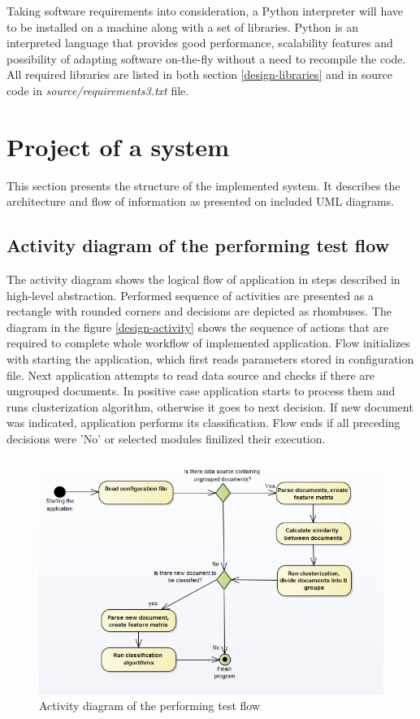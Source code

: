 Taking software requirements into consideration, a Python interpreter will have to be installed on a machine along with a set of libraries. Python is an interpreted language that provides good performance, scalability features and possibility of adapting software on-the-fly without a need to recompile the code. All required libraries are listed in both section \ref{design-libraries} and in source code in \textit{source/requirements3.txt} file.
 
 
\section{Project of a system} \label{project}
 This section presents the structure of the implemented system. It describes the architecture and flow of information as presented on included UML diagrams.
 
\subsection{Activity diagram of the performing test flow}
The activity diagram shows the logical flow of application in steps described in high-level abstraction. Performed sequence of activities are presented as a rectangle with rounded corners and decisions are depicted as rhombuses. The diagram in the figure \ref{design-activity} shows the sequence of actions that are required to complete whole workflow of implemented application. Flow initializes with starting the application, which first reads parameters stored in configuration file. Next application attempts to read data source and checks if there are ungrouped documents. In positive case application starts to process them and runs clusterization algorithm, otherwise it goes to next decision. If new document was indicated, application performs its classification.  Flow ends if all preceding decisions were 'No' or selected modules finilized their execution.

\begin{figure}[H]
	\begin{center}
		\includegraphics[width=1.0\linewidth]{images/diagrams/activity.PNG}
		\caption{Activity diagram of the performing test flow}
		\label{design-activity-diagram}
	\end{center}
\end{figure}


